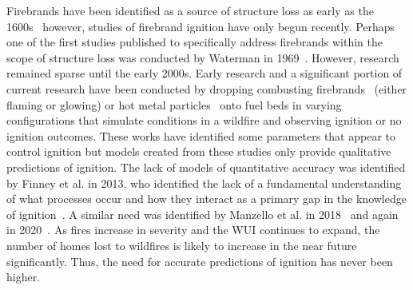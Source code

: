     
    Firebrands have been identified as a source of structure loss as early as the 1600s~\cite{Suzuki2020} however, studies of firebrand ignition have only begun recently. Perhaps one of the first studies published to specifically address firebrands within the scope of structure loss was conducted by Waterman in 1969~\cite{Waterman1969ExperiemntalGeneration}. However, research remained sparse until the early 2000s. Early research and a significant portion of current research have been conducted by dropping combusting firebrands~\cite{Ellis2011, Ellis2015, Ganteaume2009, Manzello2006, Manzello2006a} (either flaming or glowing) or hot metal particles~\cite{Wang2017, Urban2017, Fernandez-Pello2015, Hadden2011} onto fuel beds in varying configurations that simulate conditions in a wildfire and observing ignition or no ignition outcomes. These works have identified some parameters that appear to control ignition but models created from these studies only provide qualitative predictions of ignition. The lack of models of quantitative accuracy was identified by Finney et al. in 2013, who identified the lack of a fundamental understanding of what processes occur and how they interact as a primary gap in the knowledge of ignition~\cite{Finney2013}. A similar need was identified by Manzello et al. in 2018~\cite{Manzello2018} and again in 2020~\cite{Manzello2020}. As fires increase in severity and the WUI continues to expand, the number of homes lost to wildfires is likely to increase in the near future significantly. Thus, the need for accurate predictions of ignition has never been higher. 
    
    
